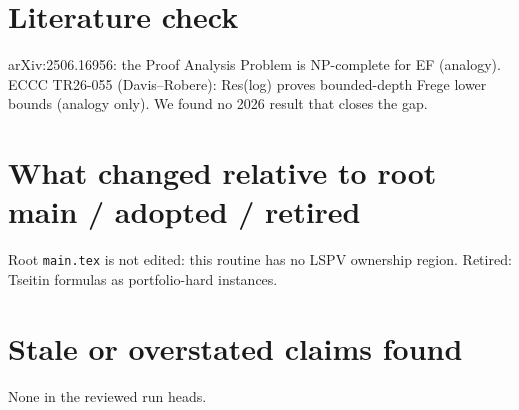 \documentclass[11pt]{article}
\begin{document}
\section*{Literature check}
arXiv:2506.16956: the Proof Analysis Problem is NP-complete for EF (analogy).
ECCC TR26-055 (Davis--Robere): Res(log) proves bounded-depth Frege lower bounds (analogy only).
We found no 2026 result that closes the gap.

\section*{What changed relative to root main / adopted / retired}
Root \texttt{main.tex} is not edited: this routine has no LSPV ownership region.
Retired: Tseitin formulas as portfolio-hard instances.

\section*{Stale or overstated claims found}
None in the reviewed run heads.
\end{document}
